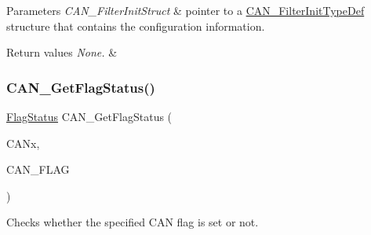 \begin{DoxyParams}{Parameters}
{\em C\+A\+N\+\_\+\+Filter\+Init\+Struct} & pointer to a \mbox{\hyperlink{struct_c_a_n___filter_init_type_def}{C\+A\+N\+\_\+\+Filter\+Init\+Type\+Def}} structure that contains the configuration information. \\
\hline
\end{DoxyParams}

\begin{DoxyRetVals}{Return values}
{\em None.} & \\
\hline
\end{DoxyRetVals}
\mbox{\label{group___c_a_n___exported___functions_ga2faad96caf823ef463cc5b5b25c480bb}} 
\subsubsection{\texorpdfstring{CAN\_GetFlagStatus()}{CAN\_GetFlagStatus()}}
{\footnotesize\ttfamily \mbox{\hyperlink{group___exported__types_ga89136caac2e14c55151f527ac02daaff}{Flag\+Status}} C\+A\+N\+\_\+\+Get\+Flag\+Status (\begin{DoxyParamCaption}\item[{\mbox{\hyperlink{struct_c_a_n___type_def}{C\+A\+N\+\_\+\+Type\+Def}} $\ast$}]{C\+A\+Nx,  }\item[{uint32\+\_\+t}]{C\+A\+N\+\_\+\+F\+L\+AG }\end{DoxyParamCaption})}



Checks whether the specified C\+AN flag is set or not. 


